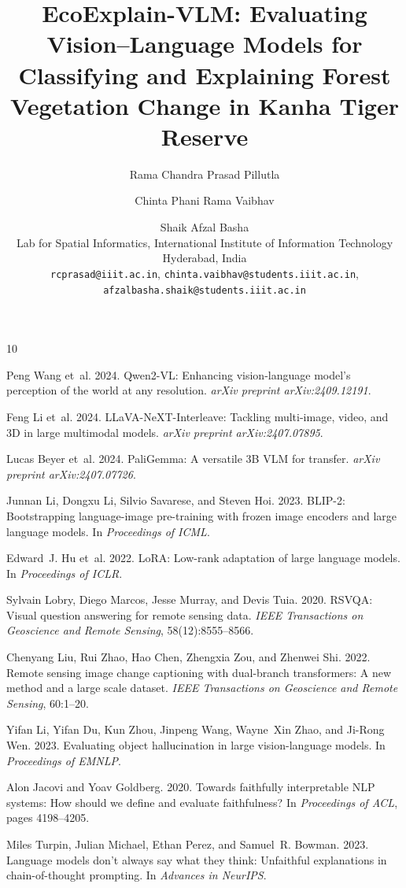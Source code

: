 \documentclass[11pt]{article}
\title{EcoExplain-VLM: Evaluating Vision--Language Models for Classifying
and Explaining Forest Vegetation Change in Kanha Tiger Reserve}
\author{
  Rama Chandra Prasad Pillutla \and
  Chinta Phani Rama Vaibhav \and
  Shaik Afzal Basha \\
  Lab for Spatial Informatics, International Institute of Information Technology Hyderabad, India \\
  \texttt{rcprasad@iiit.ac.in}, \texttt{chinta.vaibhav@students.iiit.ac.in}, \\
  \texttt{afzalbasha.shaik@students.iiit.ac.in}
}
\begin{document}
\maketitle



\begin{thebibliography}{10}

Peng Wang et~al. 2024.
\newblock Qwen2-VL: Enhancing vision-language model's perception of the world at any resolution.
\newblock \emph{arXiv preprint arXiv:2409.12191}.

Feng Li et~al. 2024.
\newblock LLaVA-NeXT-Interleave: Tackling multi-image, video, and 3D in large multimodal models.
\newblock \emph{arXiv preprint arXiv:2407.07895}.

Lucas Beyer et~al. 2024.
\newblock PaliGemma: A versatile 3B VLM for transfer.
\newblock \emph{arXiv preprint arXiv:2407.07726}.

Junnan Li, Dongxu Li, Silvio Savarese, and Steven Hoi. 2023.
\newblock BLIP-2: Bootstrapping language-image pre-training with frozen image encoders and large language models.
\newblock In \emph{Proceedings of ICML}.

Edward~J. Hu et~al. 2022.
\newblock LoRA: Low-rank adaptation of large language models.
\newblock In \emph{Proceedings of ICLR}.

Sylvain Lobry, Diego Marcos, Jesse Murray, and Devis Tuia. 2020.
\newblock RSVQA: Visual question answering for remote sensing data.
\newblock \emph{IEEE Transactions on Geoscience and Remote Sensing}, 58(12):8555--8566.

Chenyang Liu, Rui Zhao, Hao Chen, Zhengxia Zou, and Zhenwei Shi. 2022.
\newblock Remote sensing image change captioning with dual-branch transformers: A new method and a large scale dataset.
\newblock \emph{IEEE Transactions on Geoscience and Remote Sensing}, 60:1--20.

Yifan Li, Yifan Du, Kun Zhou, Jinpeng Wang, Wayne~Xin Zhao, and Ji-Rong Wen. 2023.
\newblock Evaluating object hallucination in large vision-language models.
\newblock In \emph{Proceedings of EMNLP}.

Alon Jacovi and Yoav Goldberg. 2020.
\newblock Towards faithfully interpretable NLP systems: How should we define and evaluate faithfulness?
\newblock In \emph{Proceedings of ACL}, pages 4198--4205.

Miles Turpin, Julian Michael, Ethan Perez, and Samuel~R. Bowman. 2023.
\newblock Language models don't always say what they think: Unfaithful explanations in chain-of-thought prompting.
\newblock In \emph{Advances in NeurIPS}.

\end{thebibliography}
\end{document}

